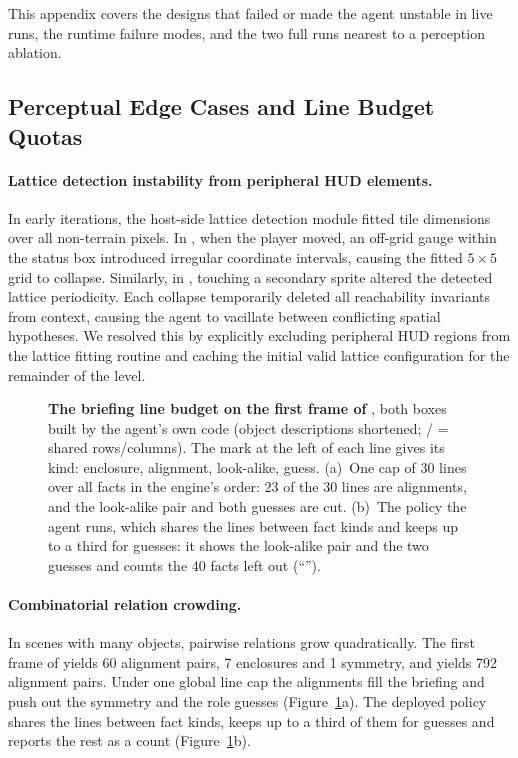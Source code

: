 This appendix covers the designs that failed or made the agent unstable in live runs, the runtime failure modes, and the two full runs nearest to a perception ablation.

\subsection{Perceptual Edge Cases and Line Budget Quotas}

\paragraph{Lattice detection instability from peripheral HUD elements.}
In early iterations, the host-side lattice detection module fitted tile dimensions over all non-terrain pixels. In , when the player moved, an off-grid gauge within the status box introduced irregular coordinate intervals, causing the fitted $5{\times}5$ grid to collapse. Similarly, in , touching a secondary sprite altered the detected lattice periodicity. Each collapse temporarily deleted all reachability invariants from context, causing the agent to vacillate between conflicting spatial hypotheses. We resolved this by explicitly excluding peripheral HUD regions from the lattice fitting routine and caching the initial valid lattice configuration for the remainder of the level.

\begin{figure}[t]
\centering

\caption{\textbf{The briefing line budget on the first frame of }, both boxes built by the agent's own  code (object descriptions shortened; / = shared rows/columns). The mark at the left of each line gives its kind: enclosure, alignment, look-alike, guess. (a)~One cap of 30 lines over all facts in the engine's order: 23 of the 30 lines are alignments, and the look-alike pair and both guesses are cut. (b)~The policy the agent runs, which shares the lines between fact kinds and keeps up to a third for guesses: it shows the look-alike pair and the two guesses and counts the 40 facts left out (``'').}
\label{fig:budget}
\end{figure}

\paragraph{Combinatorial relation crowding.}
In scenes with many objects, pairwise relations grow quadratically. The first frame of  yields 60 alignment pairs, 7 enclosures and 1 symmetry, and  yields 792 alignment pairs. Under one global line cap the alignments fill the briefing and push out the symmetry and the role guesses (Figure~\ref{fig:budget}a). The deployed policy shares the lines between fact kinds, keeps up to a third of them for guesses and reports the rest as a count (Figure~\ref{fig:budget}b).

